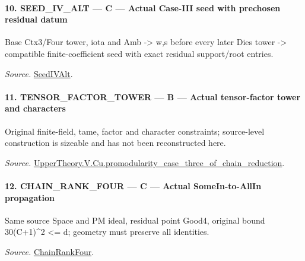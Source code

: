\paragraph{10. SEED\_\allowbreak IV\_\allowbreak ALT — C — Actual Case-III seed with prechosen residual datum}

Base Ctx3/Four tower, iota and Amb -> w,s before every later Dies tower -> compatible finite-coefficient seed with exact residual support/root entries.

\emph{Source.} \href{https://github.com/CocoSgt/riemann-hypothesis-lean/blob/7cbf7a0c32fca1badf05931879a37c3f8a2b03b4/src/Development/AutomorphicArithmetic/AutomorphicVarieties/ModularityArgument/ThresholdArguments/DenseThresholdCases/PromodularityCaseThree.lean#L19-L25}{SeedIVAlt}.



\paragraph{11. TENSOR\_\allowbreak FACTOR\_\allowbreak TOWER — B — Actual tensor-factor tower and characters}

Original finite-field, tame, factor and character constraints; source-level construction is sizeable and has not been reconstructed here.

\emph{Source.} \href{https://github.com/CocoSgt/riemann-hypothesis-lean/blob/7cbf7a0c32fca1badf05931879a37c3f8a2b03b4/src/Development/AutomorphicArithmetic/AutomorphicVarieties/ModularityArgument/ThresholdArguments/DenseThresholdCases/PromodularityCaseThreeOfLemmas.lean#L131-L153}{UpperTheory.V.Cu.promodularity\_\allowbreak case\_\allowbreak three\_\allowbreak of\_\allowbreak chain\_\allowbreak reduction}.



\paragraph{12. CHAIN\_\allowbreak RANK\_\allowbreak FOUR — C — Actual SomeIn-to-AllIn propagation}

Same source Space and PM ideal, residual point Good4, original bound 30(C+1)\textasciicircum{}2 <= d; geometry must preserve all identities.

\emph{Source.} \href{https://github.com/CocoSgt/riemann-hypothesis-lean/blob/7cbf7a0c32fca1badf05931879a37c3f8a2b03b4/src/Development/AutomorphicArithmetic/AutomorphicVarieties/ModularityArgument/ThresholdArguments/DenseThresholdCases/PromodularityCaseThree.lean#L26-L32}{ChainRankFour}.



